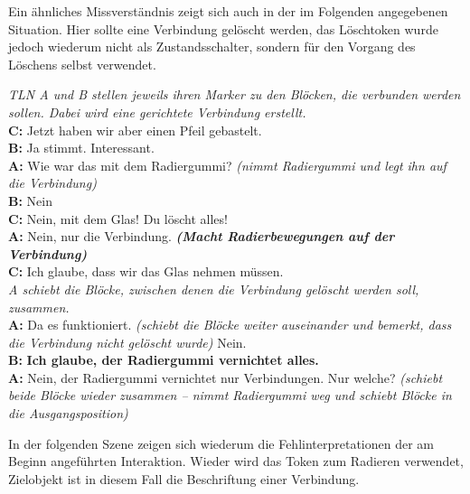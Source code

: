 Ein ähnliches Missverständnis zeigt sich auch in der im Folgenden angegebenen Situation. Hier sollte eine Verbindung gelöscht werden, das Löschtoken wurde jedoch wiederum nicht als Zustandsschalter, sondern für den Vorgang des Löschens selbst verwendet.

\begin{transkript}
	\emph{TLN A und B stellen jeweils ihren Marker zu den Blöcken, die verbunden werden sollen. Dabei wird eine gerichtete Verbindung erstellt.}\\
	\textbf{C:} Jetzt haben wir aber einen Pfeil gebastelt.\\
	\textbf{B:} Ja stimmt. Interessant.\\
	\textbf{A:} Wie war das mit dem Radiergummi? \emph{(nimmt Radiergummi und legt ihn auf die Verbindung)}\\
	\textbf{B:} Nein\\
	\textbf{C:} Nein, mit dem Glas! Du löscht alles!\\
	\textbf{A:} Nein, nur die Verbindung. \textbf{\emph{(Macht Radierbewegungen auf der Verbindung)}}\\
	\textbf{C:} Ich glaube, dass wir das Glas nehmen müssen.\\
	\emph{A schiebt die Blöcke, zwischen denen die Verbindung gelöscht werden soll, zusammen.}\\
	\textbf{A:} Da es funktioniert. \emph{(schiebt die Blöcke weiter auseinander und bemerkt, dass die Verbindung nicht gelöscht wurde)} Nein.\\
	\textbf{B:} \textbf{Ich glaube, der Radiergummi vernichtet alles.}\\
	\textbf{A:} Nein, der Radiergummi vernichtet nur Verbindungen. Nur welche? \emph{(schiebt beide Blöcke wieder zusammen – nimmt Radiergummi weg und schiebt Blöcke in die Ausgangsposition)}
\end{transkript}

In der folgenden Szene zeigen sich wiederum die Fehlinterpretationen der am Beginn angeführten Interaktion. Wieder wird das Token zum Radieren verwendet, Zielobjekt ist in diesem Fall die Beschriftung einer Verbindung.

